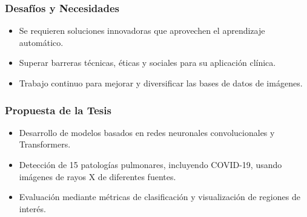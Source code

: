 \begin{frame}
\frametitle{Desafíos y Necesidades}
\begin{itemize}
    \item Se requieren soluciones innovadoras que aprovechen el aprendizaje automático.
    \item Superar barreras técnicas, éticas y sociales para su aplicación clínica.
    \item Trabajo continuo para mejorar y diversificar las bases de datos de imágenes.
\end{itemize}
\end{frame}

\begin{frame}
\frametitle{Propuesta de la Tesis}
\begin{itemize}
    \item Desarrollo de modelos basados en redes neuronales convolucionales y Transformers.
    \item Detección de 15 patologías pulmonares, incluyendo COVID-19, usando imágenes de rayos X de diferentes fuentes.
    \item Evaluación mediante métricas de clasificación y visualización de regiones de interés.
\end{itemize}
\end{frame}
